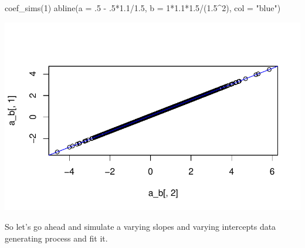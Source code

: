 \documentclass[
  letterpaper,
  DIV=11,
  numbers=noendperiod]{scrartcl}
\newenvironment{Shaded}{\begin{snugshade}}{\end{snugshade}}
\newcommand{\AttributeTok}[1]{\textcolor[rgb]{0.40,0.45,0.13}{#1}}
\newcommand{\DecValTok}[1]{\textcolor[rgb]{0.68,0.00,0.00}{#1}}
\newcommand{\FloatTok}[1]{\textcolor[rgb]{0.68,0.00,0.00}{#1}}
\newcommand{\FunctionTok}[1]{\textcolor[rgb]{0.28,0.35,0.67}{#1}}
\newcommand{\NormalTok}[1]{\textcolor[rgb]{0.00,0.23,0.31}{#1}}
\newcommand{\SpecialCharTok}[1]{\textcolor[rgb]{0.37,0.37,0.37}{#1}}
\newcommand{\StringTok}[1]{\textcolor[rgb]{0.13,0.47,0.30}{#1}}
\begin{document}
\begin{Shaded}
\begin{Highlighting}[]
\FunctionTok{coef\_sims}\NormalTok{(}\DecValTok{1}\NormalTok{)}
\FunctionTok{abline}\NormalTok{(}\AttributeTok{a =}\NormalTok{ .}\DecValTok{5} \SpecialCharTok{{-}}\NormalTok{ .}\DecValTok{5}\SpecialCharTok{*}\FloatTok{1.1}\SpecialCharTok{/}\FloatTok{1.5}\NormalTok{, }\AttributeTok{b =} \DecValTok{1}\SpecialCharTok{*}\FloatTok{1.1}\SpecialCharTok{*}\FloatTok{1.5}\SpecialCharTok{/}\NormalTok{(}\FloatTok{1.5}\SpecialCharTok{\^{}}\DecValTok{2}\NormalTok{), }\AttributeTok{col =} \StringTok{"blue"}\NormalTok{)}
\end{Highlighting}
\end{Shaded}

\includegraphics{varying_intercepts_varying_slopes_files/figure-pdf/unnamed-chunk-3-6.pdf}

So let's go ahead and simulate a varying slopes and varying intercepts
data generating process and fit it.
\end{document}
